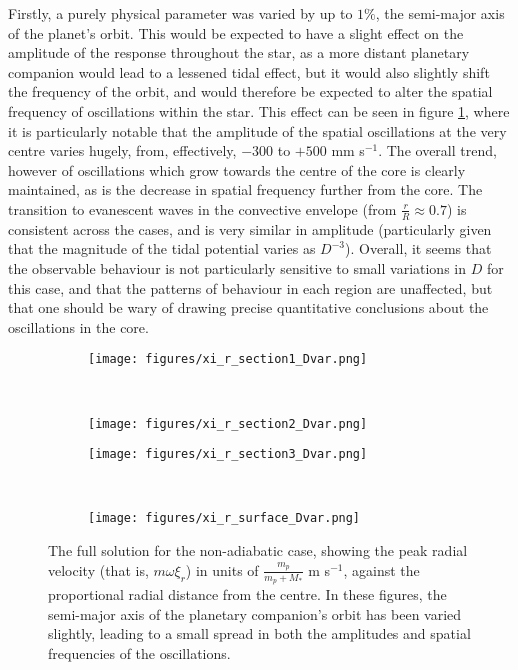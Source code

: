 \documentclass[11pt]{amsart}
\begin{document}
Firstly, a purely physical parameter was varied by up to $1 \%$, the semi-major axis of the planet's orbit.  This would be expected to have a slight effect on the amplitude of the response throughout the star, as a more distant planetary companion would lead to a lessened tidal effect, but it would also slightly shift the frequency of the orbit, and would therefore be expected to alter the spatial frequency of oscillations within the star.  This effect can be seen in figure \ref{fig:Dvar}, where it is particularly notable that the amplitude of the spatial oscillations at the very centre varies hugely, from, effectively, $-300$ to $+500$ mm s$^{-1}$.  The overall trend, however of oscillations which grow towards the centre of the core is clearly maintained, as is the decrease in spatial frequency further from the core.  The transition to evanescent waves in the convective envelope (from $\frac{r}{R} \approx 0.7$) is consistent across the cases, and is very similar in amplitude (particularly given that the magnitude of the tidal potential varies as $D^{-3}$).  Overall, it seems that the observable behaviour is not particularly sensitive to small variations in $D$ for this case, and that the patterns of behaviour in each region are unaffected, but that one should be wary of drawing precise quantitative conclusions about the oscillations in the core.





\begin{figure}[htbp]
\begin{center}
\begin{subfigure}{0.5\textwidth}
\texttt{[image: figures/xi\_r\_section1\_Dvar.png]}
\end{subfigure}
~
\begin{subfigure}{0.5\textwidth}
\texttt{[image: figures/xi\_r\_section2\_Dvar.png]}
\end{subfigure}

\begin{subfigure}{0.5\textwidth}
\texttt{[image: figures/xi\_r\_section3\_Dvar.png]}
\end{subfigure}
~
\begin{subfigure}{0.5\textwidth}
\texttt{[image: figures/xi\_r\_surface\_Dvar.png]}
\end{subfigure}

\caption{The full solution for the non-adiabatic case, showing the peak radial velocity (that is, $m \omega \xi_{r}$) in units of $\frac{m_{p}}{m_{p} + M_{*}}$ m s$^{-1}$, against the proportional radial distance from the centre.  In these figures, the semi-major axis of the planetary companion's orbit has been varied slightly, leading to a small spread in both the amplitudes and spatial frequencies of the oscillations.}
\label{fig:Dvar}
\end{center}
\end{figure}
\end{document}
